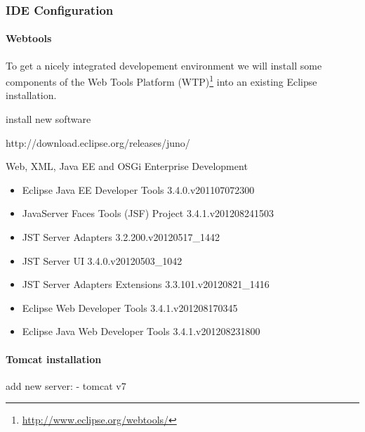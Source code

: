 \subsubsection{IDE Configuration} \label{sec:IDEConfiguration}

\paragraph{Webtools}

To get a nicely integrated developement environment we will install some components of the
Web Tools Platform (WTP)\footnote{\url{http://www.eclipse.org/webtools/}} into
an existing Eclipse installation.

install new software

http://download.eclipse.org/releases/juno/ 

Web, XML, Java EE and OSGi Enterprise Development	
\begin{itemize}
	\item Eclipse Java EE Developer Tools	3.4.0.v201107072300
	\item JavaServer Faces Tools (JSF) Project	3.4.1.v201208241503
	\item JST Server Adapters	3.2.200.v20120517\_1442
	\item JST Server UI	3.4.0.v20120503\_1042
	\item JST Server Adapters Extensions	3.3.101.v20120821\_1416
	\item Eclipse Web Developer Tools	3.4.1.v201208170345
	\item Eclipse Java Web Developer Tools	3.4.1.v201208231800
\end{itemize} 
\paragraph{Tomcat installation}

add new server:
- tomcat v7

